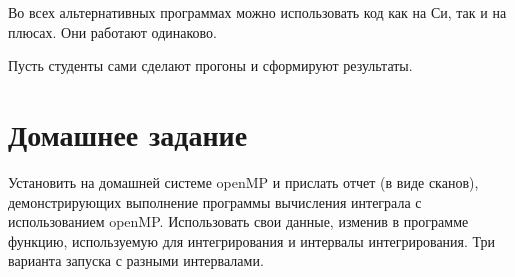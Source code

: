 Во всех альтернативных программах можно использовать код как на Си, так и на плюсах. Они работают одинаково.

Пусть студенты сами сделают прогоны и сформируют результаты.

\section{Домашнее задание}

Установить на домашней системе openMP и прислать отчет (в виде сканов), демонстрирующих выполнение программы вычисления интеграла с использованием openMP. Использовать свои данные, изменив в программе функцию, используемую для интегрирования и интервалы интегрирования. Три варианта запуска с разными интервалами.
